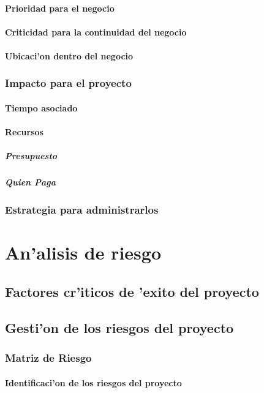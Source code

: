 \documentclass[letterpaper,openright,10pt,oneside]{report}
\begin{document}
			\subsection{Prioridad para el negocio}
			\subsection{Criticidad para la continuidad del negocio}
			\subsection{Ubicaci'on dentro del negocio}
		\section{Impacto para el proyecto}
			\subsection{Tiempo asociado}
			\subsection{Recursos}
				\subsubsection{Presupuesto}
				\subsubsection{Quien Paga}
		\section{Estrategia para administrarlos}
\part{An'alisis de riesgo}
	\chapter{Factores cr'iticos de 'exito del proyecto}
	\chapter{Gesti'on de los riesgos del proyecto}
		\section{Matriz de Riesgo}
			\subsection{Identificaci'on de los riesgos del proyecto}
\end{document}
